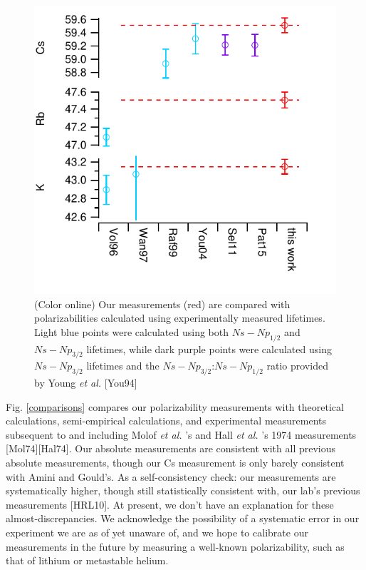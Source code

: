 \documentclass[twocolumn, prl,showpacs,superscriptaddress]{revtex4-1}   %
\newcommand{\figref}[1]{Fig. \ref{#1}}
\newcommand{\etal}{\textit{et al. }}
\begin{document}
\begin{figure}
\includegraphics[width=\linewidth,keepaspectratio]{displayLifeComps.pdf}
\caption{\label{comparisonsLifetimes}(Color online) Our measurements (red) are compared with polarizabilities calculated using experimentally measured lifetimes. Light blue points were calculated using both $Ns-Np_{1/2}$ and $Ns-Np_{3/2}$ lifetimes, while dark purple points were calculated using $Ns-Np_{3/2}$ lifetimes and the $Ns-Np_{3/2}$:$Ns-Np_{1/2}$ ratio provided by Young \etal [You94]}
\end{figure}

\figref{comparisons} compares our polarizability measurements with theoretical calculations, semi-empirical calculations, and experimental measurements subsequent to and including Molof \etal's and Hall \etal's 1974 measurements [Mol74][Hal74]. Our absolute measurements are consistent with all previous absolute measurements, though our Cs measurement is only barely consistent with Amini and Gould's. As a self-consistency check: our measurements are systematically higher, though still statistically consistent with, our lab's previous measurements [HRL10]. At present, we don't have an explanation for these almost-discrepancies. We acknowledge the possibility of a systematic error in our experiment we are as of yet unaware of, and we hope to calibrate our measurements in the future by measuring a well-known polarizability, such as that of lithium or metastable helium.
\end{document}
